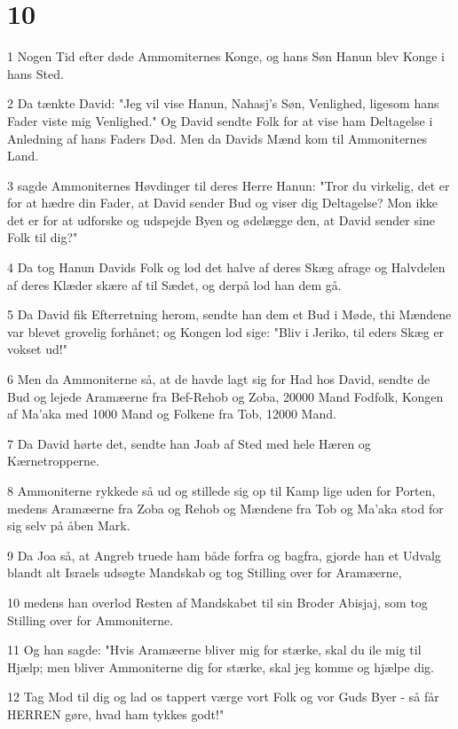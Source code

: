 \chapter{10}

\par 1 Nogen Tid efter døde Ammomiternes Konge, og hans Søn Hanun blev Konge i hans Sted.
\par 2 Da tænkte David: "Jeg vil vise Hanun, Nahasj's Søn, Venlighed, ligesom hans Fader viste mig Venlighed." Og David sendte Folk for at vise ham Deltagelse i Anledning af hans Faders Død. Men da Davids Mænd kom til Ammoniternes Land.
\par 3 sagde Ammoniternes Høvdinger til deres Herre Hanun: "Tror du virkelig, det er for at hædre din Fader, at David sender Bud og viser dig Deltagelse? Mon ikke det er for at udforske og udspejde Byen og ødelægge den, at David sender sine Folk til dig?"
\par 4 Da tog Hanun Davids Folk og lod det halve af deres Skæg afrage og Halvdelen af deres Klæder skære af til Sædet, og derpå lod han dem gå.
\par 5 Da David fik Efterretning herom, sendte han dem et Bud i Møde, thi Mændene var blevet grovelig forhånet; og Kongen lod sige: "Bliv i Jeriko, til eders Skæg er vokset ud!"
\par 6 Men da Ammoniterne så, at de havde lagt sig for Had hos David, sendte de Bud og lejede Aramæerne fra Bef-Rehob og Zoba, 20000 Mand Fodfolk, Kongen af Ma'aka med 1000 Mand og Folkene fra Tob, 12000 Mand.
\par 7 Da David hørte det, sendte han Joab af Sted med hele Hæren og Kærnetropperne.
\par 8 Ammoniterne rykkede så ud og stillede sig op til Kamp lige uden for Porten, medens Aramæerne fra Zoba og Rehob og Mændene fra Tob og Ma'aka stod for sig selv på åben Mark.
\par 9 Da Joa så, at Angreb truede ham både forfra og bagfra, gjorde han et Udvalg blandt alt Israels udsøgte Mandskab og tog Stilling over for Aramæerne,
\par 10 medens han overlod Resten af Mandskabet til sin Broder Abisjaj, som tog Stilling over for Ammoniterne.
\par 11 Og han sagde: "Hvis Aramæerne bliver mig for stærke, skal du ile mig til Hjælp; men bliver Ammoniterne dig for stærke, skal jeg komme og hjælpe dig.
\par 12 Tag Mod til dig og lad os tappert værge vort Folk og vor Guds Byer - så får HERREN gøre, hvad ham tykkes godt!"
